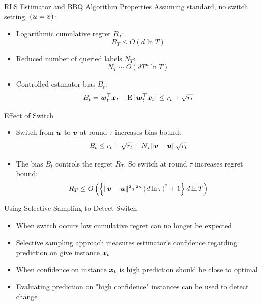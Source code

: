 \documentclass{beamer}
\begin{document}
\begin{frame}{RLS Estimator and  BBQ Algorithm Properties}
Assuming standard, no switch setting, $\left({\boldsymbol{u}}={\boldsymbol{v}}\right)$:\newline
\begin{itemize}
\item Logarithmic cumulative regret $R_T$:
\begin{equation}
 R_T\leq O\left(d\ln{T}\right)
\end{equation}
\item Reduced number of queried labels $N_T$:
\begin{equation}
N_T\sim O\left(dT^{\kappa}\ln{T}\right)
\end{equation}
\item Controlled estimator bias $B_t$:
\begin{equation}
B_t={{\boldsymbol{w}}}^{\top}_{t}{\boldsymbol{x}}_{t}-{\rm E}\left[{{{\boldsymbol{w}}}^{\top}_{t}{\boldsymbol{x}}_{t}}\right]\leq r_t+\sqrt{r_t}
\end{equation}
\end{itemize} 
\end{frame}


\begin{frame}{Effect of Switch}
\begin{itemize}
\item Switch from ${\boldsymbol{u}}$ to ${\boldsymbol{v}}$ at round $\tau$ increases bias bound:\newline
\newline
\begin{equation}
B_t\leq r_t+\sqrt{r_t}+N_{\tau}\|{\boldsymbol{v}}-{\boldsymbol{u}}\|\sqrt{r_t}
\end{equation}\newline
\item The bias $B_t$ controls the regret $R_T$. So switch at round $\tau$ increases regret bound:\newline\newline
\begin{equation}
 R_T\leq O\left(\left\{\|{\boldsymbol{v}}-{\boldsymbol{u}}\|^2{\tau}^{2\kappa}\left(d\ln{\tau}\right)^2+1\right\}d\ln{T}\right)
\end{equation}
\end{itemize}
\end{frame}

\begin{frame}{Using Selective Sampling to Detect Switch}
\begin{itemize}
\item When switch occurs low cumulative regret can no longer be expected \newline
\item Selective sampling approach measures estimator's confidence regarding prediction on give instance ${\boldsymbol{x}}_{t}$ \newline
\item When confidence on instance ${\boldsymbol{x}}_{t}$ is high prediction should be close to optimal \newline
\item Evaluating prediction on "high confidence" instances can be used to detect change \newline
\end{itemize}


\end{frame}
\end{document}
